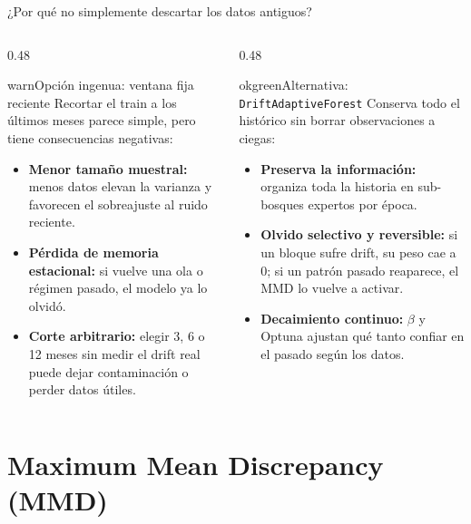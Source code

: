 \documentclass[aspectratio=169,11pt,table]{beamer}
\begin{document}
\begin{frame}{¿Por qué no simplemente descartar los datos antiguos?}
\begin{columns}[T,onlytextwidth]
\begin{column}{0.48\textwidth}
\begin{contrastbox}{warn}{Opción ingenua: ventana fija reciente}
\scriptsize
Recortar el train a los últimos meses parece simple, pero tiene consecuencias negativas:
\begin{itemize}
  \item \textbf{Menor tamaño muestral:} menos datos elevan la varianza y favorecen el sobreajuste al ruido reciente.
  \item \textbf{Pérdida de memoria estacional:} si vuelve una ola o régimen pasado, el modelo ya lo olvidó.
  \item \textbf{Corte arbitrario:} elegir 3, 6 o 12 meses sin medir el drift real puede dejar contaminación o perder datos útiles.
\end{itemize}
\end{contrastbox}
\end{column}
\begin{column}{0.48\textwidth}
\begin{contrastbox}{okgreen}{Alternativa: \texttt{DriftAdaptiveForest}}
\scriptsize
Conserva todo el histórico sin borrar observaciones a ciegas:
\begin{itemize}
  \item \textbf{Preserva la información:} organiza toda la historia en sub-bosques expertos por época.
  \item \textbf{Olvido selectivo y reversible:} si un bloque sufre drift, su peso cae a $0$; si un patrón pasado reaparece, el MMD lo vuelve a activar.
  \item \textbf{Decaimiento continuo:} $\beta$ y Optuna ajustan qué tanto confiar en el pasado según los datos.
\end{itemize}
\end{contrastbox}
\end{column}
\end{columns}
\end{frame}

\section{Maximum Mean Discrepancy (MMD)}
\end{document}
